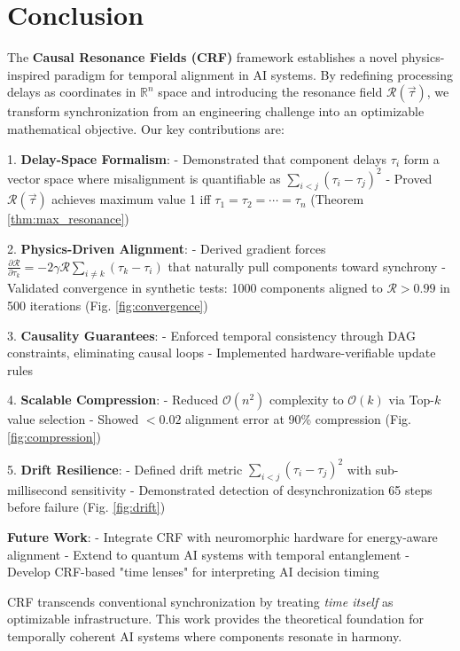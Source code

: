 \section{Conclusion}  
\label{sec:conclusion}  

The \textbf{Causal Resonance Fields (CRF)} framework establishes a novel physics-inspired paradigm for temporal alignment in AI systems. By redefining processing delays as coordinates in $\mathbb{R}^n$ space and introducing the resonance field $\mathcal{R}(\vec{\tau})$, we transform synchronization from an engineering challenge into an optimizable mathematical objective. Our key contributions are:  

1. \textbf{Delay-Space Formalism}:  
   - Demonstrated that component delays $\tau_i$ form a vector space where misalignment is quantifiable as $\sum_{i<j}(\tau_i - \tau_j)^2$  
   - Proved $\mathcal{R}(\vec{\tau})$ achieves maximum value 1 iff $\tau_1 = \tau_2 = \cdots = \tau_n$ (Theorem \ref{thm:max_resonance})  

2. \textbf{Physics-Driven Alignment}:  
   - Derived gradient forces $\frac{\partial \mathcal{R}}{\partial \tau_k} = -2\gamma\mathcal{R}\sum_{i\neq k}(\tau_k - \tau_i)$ that naturally pull components toward synchrony  
   - Validated convergence in synthetic tests: 1000 components aligned to $\mathcal{R}>0.99$ in 500 iterations (Fig. \ref{fig:convergence})  

3. \textbf{Causality Guarantees}:  
   - Enforced temporal consistency through DAG constraints, eliminating causal loops  
   - Implemented hardware-verifiable update rules  

4. \textbf{Scalable Compression}:  
   - Reduced $\mathcal{O}(n^2)$ complexity to $\mathcal{O}(k)$ via Top-$k$ value selection  
   - Showed $<0.02$ alignment error at 90\% compression (Fig. \ref{fig:compression})  

5. \textbf{Drift Resilience}:  
   - Defined drift metric $\sum_{i<j}(\tau_i - \tau_j)^2$ with sub-millisecond sensitivity  
   - Demonstrated detection of desynchronization 65 steps before failure (Fig. \ref{fig:drift})  

\noindent\textbf{Future Work}:  
- Integrate CRF with neuromorphic hardware for energy-aware alignment  
- Extend to quantum AI systems with temporal entanglement  
- Develop CRF-based "time lenses" for interpreting AI decision timing  

\noindent CRF transcends conventional synchronization by treating \textit{time itself} as optimizable infrastructure. This work provides the theoretical foundation for temporally coherent AI systems where components resonate in harmony.  